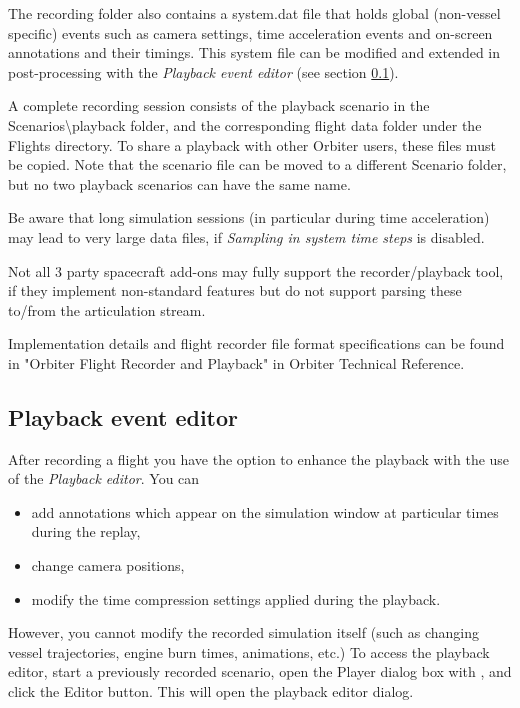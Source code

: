 \documentclass[Orbiter User Manual.tex]{subfiles}
\begin{document}
The recording folder also contains a system.dat file that holds global
(non-vessel specific) events such as camera settings, time acceleration events
and on-screen annotations and their timings. This system file can be modified
and extended in post-processing with the \emph{Playback event editor} (see
section \ref{sec:flight_playbackedit}).

A complete recording session consists of the playback scenario in the
Scenarios\textbackslash playback folder, and the corresponding flight data
folder under the Flights directory. To share a playback with other Orbiter
users, these files must be copied. Note that the scenario file can be moved to a
different Scenario folder, but no two playback scenarios can have the same
name.

Be aware that long simulation sessions (in particular during time acceleration)
may lead to very large data files, if \emph{Sampling in system time steps} is
disabled.

Not all 3 party spacecraft add-ons may fully support the
recorder/playback tool, if they implement non-standard features but do not
support parsing these to/from the articulation stream.

Implementation details and flight recorder file format specifications can be
found in "Orbiter Flight Recorder and Playback" in Orbiter Technical Reference.


\subsection{Playback event editor}
\label{sec:flight_playbackedit}
After recording a flight you have the option to enhance the playback with the
use of the \emph{Playback editor}. You can

\begin{itemize}
	\item add annotations which appear on the simulation window at particular
		times during the replay,
	\item change camera positions,
	\item modify the time compression settings applied during the playback.
\end{itemize}

However, you cannot modify the recorded simulation itself (such as changing
vessel trajectories, engine burn times, animations, etc.) To access the playback
editor, start a previously recorded scenario, open the Player dialog box with
, and click the Editor button. This will open the playback
editor dialog.
\end{document}
